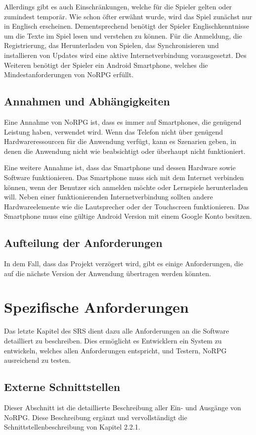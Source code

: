 		Allerdings gibt es auch Einschränkungen, welche für die Spieler gelten oder zumindest temporär. Wie schon öfter erwähnt wurde, wird das Spiel zunächst nur in Englisch erscheinen. Dementsprechend benötigt der Spieler Englischkenntnisse um die Texte im Spiel lesen und verstehen zu können. Für die Anmeldung, die Registrierung, das Herunterladen von Spielen, das Synchronisieren und installieren von Updates wird eine aktive Internetverbindung vorausgesetzt. Des Weiteren benötigt der Spieler ein Android Smartphone, welches die Mindestanforderungen von NoRPG erfüllt.
				
	\subsection{Annahmen und Abhängigkeiten}
		Eine Annahme von NoRPG ist, dass es immer auf Smartphones, die genügend Leistung haben, verwendet wird. Wenn das Telefon nicht über genügend Hardwareressourcen für die Anwendung verfügt, kann es Szenarien geben, in denen die Anwendung nicht wie beabsichtigt oder überhaupt nicht funktioniert.
		
		Eine weitere Annahme ist, dass das Smartphone und dessen Hardware sowie Software funktionieren. Das Smartphone muss sich mit dem Internet verbinden können, wenn der Benutzer sich anmelden möchte oder Lernspiele herunterladen will. Neben einer funktionierenden Internetverbindung sollten andere Hardwareelemente wie die Lautsprecher oder der Touchscreen funktionieren. Das Smartphone muss eine gültige Android Version mit einem Google Konto besitzen.
		
	\subsection{Aufteilung der Anforderungen}
		In dem Fall, dass das Projekt verzögert wird, gibt es einige Anforderungen, die auf die nächste Version der Anwendung übertragen werden könnten.

\section{Spezifische Anforderungen}
	Das letzte Kapitel des SRS dient dazu alle Anforderungen an die Software detailliert zu beschreiben. Dies ermöglicht es Entwicklern ein System zu entwickeln, welches allen Anforderungen entspricht, und Testern, NoRPG ausreichend zu testen.
	
	\subsection{Externe Schnittstellen}
		Dieser Abschnitt ist die detaillierte Beschreibung aller Ein- und Ausgänge von NoRPG. Diese Beschreibung ergänzt und vervollständigt die Schnittstellenbeschreibung von Kapitel 2.2.1. 
	
